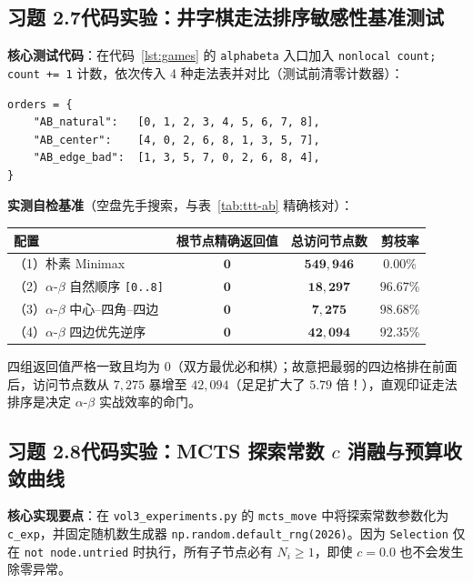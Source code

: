 \subsection*{习题 2.7\quad 代码实验：井字棋走法排序敏感性基准测试}
\textbf{核心测试代码}：在代码~\ref{lst:games} 的 \texttt{alphabeta} 入口加入 \texttt{nonlocal count; count += 1} 计数，依次传入 4 种走法表并对比（测试前清零计数器）：
\begin{lstlisting}
orders = {
    "AB_natural":   [0, 1, 2, 3, 4, 5, 6, 7, 8],
    "AB_center":    [4, 0, 2, 6, 8, 1, 3, 5, 7],
    "AB_edge_bad":  [1, 3, 5, 7, 0, 2, 6, 8, 4],
}
\end{lstlisting}
\textbf{实测自检基准}（空盘先手搜索，与表~\ref{tab:ttt-ab} 精确核对）：
\begin{center}
\small
\begin{tabular}{@{}lccc@{}}
\toprule
\textbf{配置} & \textbf{根节点精确返回值} & \textbf{总访问节点数} & \textbf{剪枝率} \\
\midrule
（1）朴素 Minimax & $\mathbf{0}$ & $\mathbf{549{,}946}$ & $0.00\%$ \\
（2）$\alpha$-$\beta$ 自然顺序 \texttt{[0..8]} & $\mathbf{0}$ & $\mathbf{18{,}297}$ & $\mathbf{96.67\%}$ \\
（3）$\alpha$-$\beta$ 中心--四角--四边 & $\mathbf{0}$ & $\mathbf{7{,}275}$ & $\mathbf{98.68\%}$ \\
（4）$\alpha$-$\beta$ 四边优先逆序 & $\mathbf{0}$ & $\mathbf{42{,}094}$ & $\mathbf{92.35\%}$ \\
\bottomrule
\end{tabular}
\end{center}
四组返回值严格一致且均为 $0$（双方最优必和棋）；故意把最弱的四边格排在前面后，访问节点数从 $7{,}275$ 暴增至 $42{,}094$（足足扩大了 $\mathbf{5.79}$ 倍！），直观印证走法排序是决定 $\alpha$-$\beta$ 实战效率的命门。

\subsection*{习题 2.8\quad 代码实验：MCTS 探索常数 $c$ 消融与预算收敛曲线}
\textbf{核心实现要点}：在 \texttt{vol3\_experiments.py} 的 \texttt{mcts\_move} 中将探索常数参数化为 \texttt{c\_exp}，并固定随机数生成器 \texttt{np.random.default\_rng(2026)}。因为 \texttt{Selection} 仅在 \texttt{not node.untried} 时执行，所有子节点必有 $N_i \ge 1$，即使 $c = 0.0$ 也不会发生除零异常。

